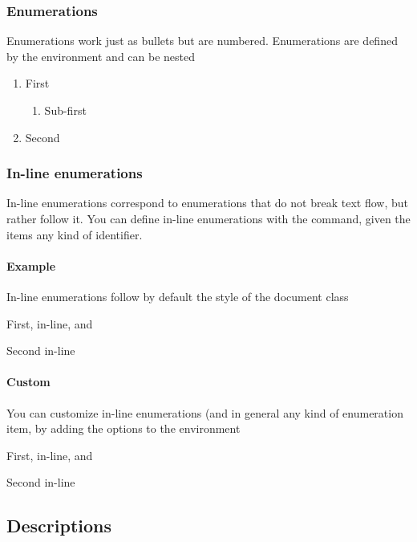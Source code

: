 \subsubsection{Enumerations}

Enumerations work just as bullets but are numbered. Enumerations are defined by the  environment and can be nested

\begin{enumerate}
\item First
\begin{enumerate}
\item Sub-first
\end{enumerate}
\item Second
\end{enumerate}

\subsubsection{In-line enumerations}

In-line enumerations correspond to enumerations that do not break text flow, but rather follow it.
You can define in-line enumerations with the  command, given the items any kind of identifier.

\paragraph{Example} 
In-line enumerations follow by default the style of the document class
\begin{enumerate*}
\item First, in-line, and 
\item Second in-line
\end{enumerate*}

\paragraph{Custom} 
You can customize in-line enumerations (and in general any kind of enumeration item, by adding the options to the environment
\begin{enumerate*}[label=(\arabic*)]
\item First, in-line, and 
\item Second in-line
\end{enumerate*}


\subsection{Descriptions}
\label{sec:descriptions}


